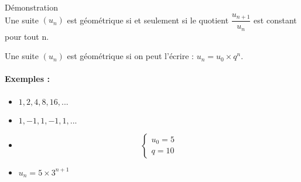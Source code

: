 \documentclass[11pt]{article}%
\begin{document}
\begin{multicols}{2}
\begin{Proposition}{Démonstration}\\
 Une suite $(u_n)$ est géométrique si et seulement si le quotient $\dfrac{u_{n+1}}{u_n}$ est constant pour tout n.
\end{Proposition}

\begin{Proposition}{}
  Une suite $(u_n)$ est géométrique si on peut l'écrire : $u_{n} = u_0 \times q^n$.
\end{Proposition}

\paragraph{Exemples : }
\begin{itemize}
\item $1, 2, 4, 8, 16, ... $
\item $1, -1, 1, - 1 , 1 , ...$
\item 
\begin{equation*}
  \left\lbrace
  \begin{array}{ccc}
    u_0 = 5\\
    q = 10
  \end{array}\right.
\end{equation*}

\item $u_n  = 5 \times 3^{n+1}$
\end{itemize}
\end{multicols}
\end{document}
